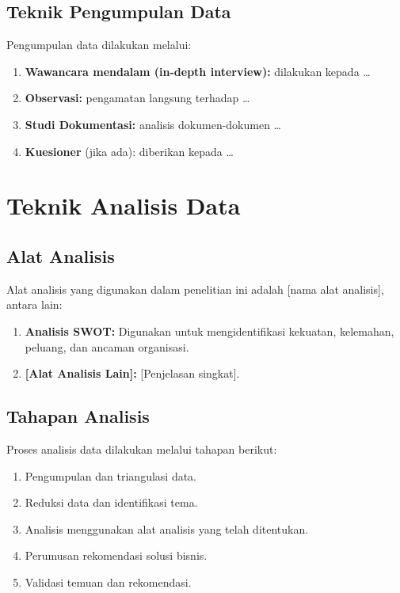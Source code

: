 \subsection{Teknik Pengumpulan Data}
Pengumpulan data dilakukan melalui:
\begin{enumerate}
  \item \textbf{Wawancara mendalam (in-depth interview):} dilakukan kepada \ldots
  \item \textbf{Observasi:} pengamatan langsung terhadap \ldots
  \item \textbf{Studi Dokumentasi:} analisis dokumen-dokumen \ldots
  \item \textbf{Kuesioner} (jika ada): diberikan kepada \ldots
\end{enumerate}

\section{Teknik Analisis Data}
\label{sec:teknik-analisis-bisnis}

\subsection{Alat Analisis}
Alat analisis yang digunakan dalam penelitian ini adalah [nama alat analisis],
antara lain:

\begin{enumerate}
  \item \textbf{Analisis SWOT:} Digunakan untuk mengidentifikasi kekuatan,
        kelemahan, peluang, dan ancaman organisasi.
  \item \textbf{[Alat Analisis Lain]:} [Penjelasan singkat].
\end{enumerate}

\subsection{Tahapan Analisis}
Proses analisis data dilakukan melalui tahapan berikut:
\begin{enumerate}
  \item Pengumpulan dan triangulasi data.
  \item Reduksi data dan identifikasi tema.
  \item Analisis menggunakan alat analisis yang telah ditentukan.
  \item Perumusan rekomendasi solusi bisnis.
  \item Validasi temuan dan rekomendasi.
\end{enumerate}
